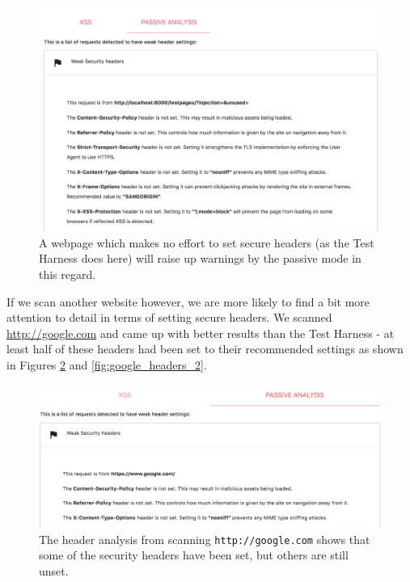 \begin{figure}[h!]
	\centering
	\includegraphics[width=\textwidth]{images/passive_weak_headers_1.png}
	\caption{A webpage which makes no effort to set secure headers (as the Test Harness does here) will raise up warnings by the passive mode in this regard.}
	\label{fig:passive_weak_headers_1}
\end{figure}

If we scan another website however, we are more likely to find a bit more attention to detail in terms of setting secure headers. We scanned \url{http://google.com} and came up with better results than the Test Harness - at least half of these headers had been set to their recommended settings as shown in Figures \ref{fig:google_headers} and \ref{fig:google_headers_2}. \\

\begin{figure}[h!]
	\centering
	\includegraphics[width=\textwidth]{images/google_headers.png}
	\caption{The header analysis from scanning \texttt{http://google.com} shows that some of the security headers have been set, but others are still unset.}
	\label{fig:google_headers}
\end{figure}

